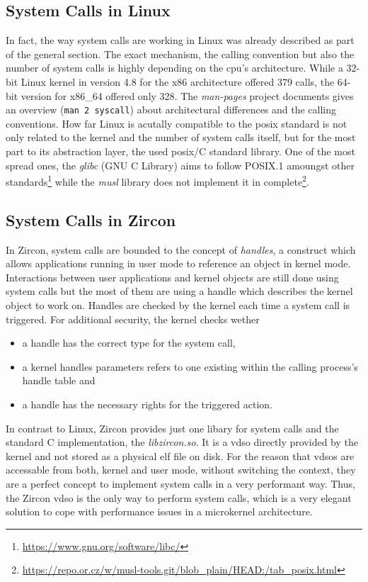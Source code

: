 \subsection{System Calls in Linux}
In fact, the way system calls are working in Linux was already described as part of the general section. 
The exact mechanism, the calling convention but also the number of system calls is highly depending on the \ac{cpu}'s architecture.
While a 32-bit Linux kernel in version 4.8 for the x86 architecture offered 379 calls, the 64-bit version for x86\_64 offered only 328\cite{lfd430}.
The \textit{man-pages} project documents gives an overview (\texttt{man 2 syscall}) about architectural differences and the calling conventions.
How far Linux is acutally compatible to the \ac{posix} standard is not only related to the kernel and the number of system calls itself, but for the most part to its abstraction layer, the used \ac{posix}/C standard library.
One of the most spread ones, the \textit{glibc} (GNU C Library) aims to follow POSIX.1 amoungst other standards\footnote{\url{https://www.gnu.org/software/libc/}} while the \textit{musl} library does not implement it in complete\footnote{\url{https://repo.or.cz/w/musl-tools.git/blob_plain/HEAD:/tab_posix.html}}.



\subsection{System Calls in Zircon}
In Zircon, system calls are bounded to the concept of \textit{handles}, a construct which allows applications running in user mode to reference an object in kernel mode\cite{zircon-handle}.
Interactions between user applications and kernel objects are still done using system calls but the most of them are using a handle which describes the kernel object to work on\cite{zircon-concepts}. 
Handles are checked by the kernel each time a system call is triggered.
For additional security, the kernel checks wether
\begin{itemize}
    \item a handle has the correct type for the system call, 
    \item a kernel handles parameters refers to one existing within the calling process's handle table and
    \item a handle has the necessary rights for the triggered action\cite{zircon-concepts}.
\end{itemize}
% 
In contrast to Linux, Zircon provides just one libary for system calls and the standard C implementation, the \textit{libzircon.so}.
It is a \acf{vdso} directly provided by the kernel and not stored as a physical \ac{elf} file on disk.
For the reason that \acp{vdso} are accessable from both, kernel and user mode, without switching the context, they are a perfect concept to implement system calls in a very performant way\cite{vdso-linuxjournal}.
Thus, the Zircon \ac{vdso} is the only way to perform system calls\cite{zircon-vdso}, which is a very elegant solution to cope with performance issues in a microkernel architecture.

